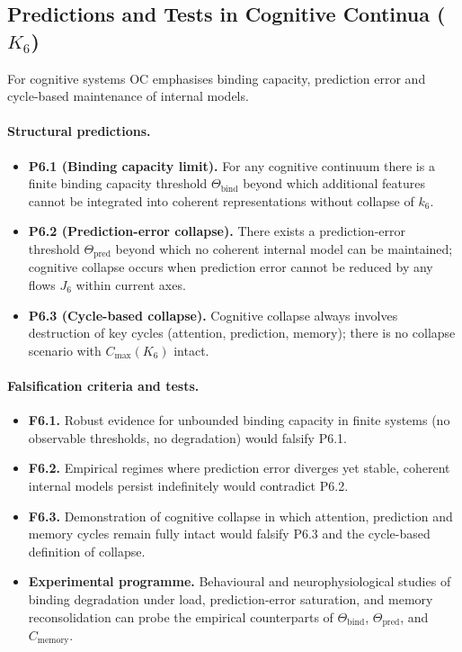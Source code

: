 \subsection{Predictions and Tests in Cognitive Continua
            (\texorpdfstring{$K_6$}{K\_6})}

For cognitive systems OC emphasises binding capacity, prediction error and
cycle-based maintenance of internal models.

\paragraph{Structural predictions.}
\begin{itemize}
  \item \textbf{P6.1 (Binding capacity limit).}
        For any cognitive continuum there is a finite binding capacity
        threshold \(\Theta_{\mathrm{bind}}\) beyond which additional
        features cannot be integrated into coherent representations
        without collapse of \(k_6\).
  \item \textbf{P6.2 (Prediction-error collapse).}
        There exists a prediction-error threshold \(\Theta_{\mathrm{pred}}\)
        beyond which no coherent internal model can be maintained; cognitive
        collapse occurs when prediction error cannot be reduced by any
        flows \(J_6\) within current axes.
  \item \textbf{P6.3 (Cycle-based collapse).}
        Cognitive collapse always involves destruction of key cycles
        (attention, prediction, memory); there is no collapse scenario
        with \(C_{\max}(K_6)\) intact.
\end{itemize}

\paragraph{Falsification criteria and tests.}
\begin{itemize}
  \item \textbf{F6.1.}
        Robust evidence for unbounded binding capacity in finite systems
        (no observable thresholds, no degradation) would falsify P6.1.
  \item \textbf{F6.2.}
        Empirical regimes where prediction error diverges yet stable,
        coherent internal models persist indefinitely would contradict P6.2.
  \item \textbf{F6.3.}
        Demonstration of cognitive collapse in which attention, prediction
        and memory cycles remain fully intact would falsify P6.3 and the
        cycle-based definition of collapse.
  \item \textbf{Experimental programme.}
        Behavioural and neurophysiological studies of binding degradation
        under load, prediction-error saturation, and memory reconsolidation
        can probe the empirical counterparts of
        \(\Theta_{\mathrm{bind}}\),
        \(\Theta_{\mathrm{pred}}\),
        and \(C_{\mathrm{memory}}\).
\end{itemize}

